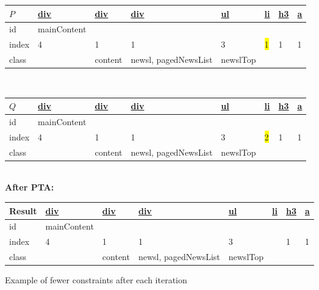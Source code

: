 \begin{figure}[htbp]
\centering
\small
	\begin{tabular}{|l l l l l l l l|}
	\hline
	$P$ & \url{div}	&	\url{div}	&	\url{div}	&	\url{ul}	&	\url{li}	&	\url{h3}	&	\url{a} \\\hline
	id		&mainContent&	&	&	&	&	&	 \\
	index	&	4	&	1		&	1	&	3	&	\colorbox{yellow}{1}	&	1	&	1 \\
	class	&		&	content	&	newsl, pagedNewsList	&	newslTop &	&	& \\
	\hline
	\end{tabular} \\
	\begin{tabular}{|l l l l l l l l|}
	\hline
	$Q$ 	& \url{div}	&	\url{div}	&	\url{div}	&	\url{ul}	&	\url{li}	&	\url{h3}	&	\url{a} \\\hline
	id		&mainContent&	&	&	&	&	&	 \\
	index	&	4	&	1		&	1	&	3	&	\colorbox{yellow}{2}	&	1	&	1 \\
	class	&		&	content	&	newsl, pagedNewsList	&	newslTop &	&	& \\
	\hline
	\end{tabular}\\
	\textbf{After PTA:}\\
	\begin{tabular}{|l l l l l l l l|}
	\hline
	Result 	& \url{div}	&	\url{div}	&	\url{div}	&	\url{ul}	&	\url{li}	&	\url{h3}	&	\url{a} \\\hline
	id		&mainContent&	&	&	&	&	&	 \\
	index	&	4	&	1		&	1	&	3	&		&	1	&	1 \\
	class	&		&	content	&	newsl, pagedNewsList	&	newslTop &	&	& \\
	\hline
	\end{tabular}
\caption{Example of fewer constraints after each iteration}
\label{tab:lcsexample}
\end{figure}